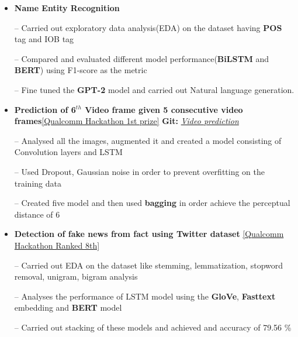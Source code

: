 \documentclass{article}
\begin{document}
\begin{itemize}
\setlength{\itemsep}{-0.15em}

\item \textbf{Name Entity Recognition}
\item[--] Carried out exploratory data analysis(EDA) on the dataset having \textbf{POS} tag and IOB tag
\item[--] Compared and evaluated different model performance(\textbf{BiLSTM} and \textbf{BERT}) using F1-score as the metric
\item[--] Fine tuned the \textbf{GPT-2} model and carried out Natural language generation.

\item \textbf{Prediction of {6$^{th}$} Video frame given 5 consecutive video frames}\hfill{\href{https://drive.google.com/file/d/1uwSr-1dlImn5JYRzPpn62ublzCWKSGr0/view?usp=sharing}{[Qualcomm Hackathon 1st prize]}}
\textbf{Git:} \href{https://github.com/153079019shariq/catz_contest}{\textit{Video prediction}}
\item[--] Analysed all the images, augmented it  and created a model consisting of Convolution layers and LSTM
\item[--] Used Dropout, Gaussian noise in order to prevent overfitting on the training data
\item[--]Created five model and then used \textbf{bagging} in order achieve the perceptual distance of 6 

\item \textbf{Detection of fake news from fact using Twitter dataset}
\hfill{\href{https://drive.google.com/file/d/1mOlilPLZSuHSyqRIVukRvXs_700Hmz5I/view?usp=sharing}{[Qualcomm Hackathon Ranked 8th]}}
\item[--] Carried out EDA on the dataset like stemming, lemmatization, stopword removal, unigram, bigram analysis
\item[--] Analyses the performance of LSTM model using the \textbf{GloVe}, \textbf{Fasttext} embedding and \textbf{BERT}  model
\item[--] Carried out stacking of these models and achieved and accuracy of 79.56 \%
\end{itemize}
\end{document}
